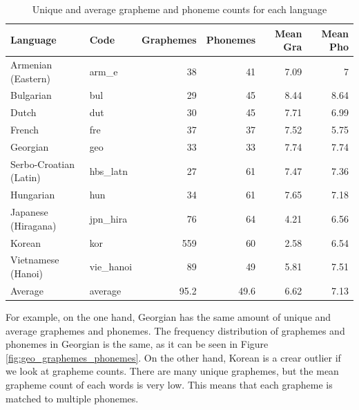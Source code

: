 \documentclass[11pt,a4paper]{article}
\begin{document}
\begin{table}[ht]
\centering
\begin{tabular}{llrrrr}
\toprule
               Language &       Code & Graphemes & Phonemes & Mean Gra & Mean Pho \\
\midrule
     Armenian (Eastern) &      arm\_e &               38 &              41 &              7.09 &                7 \\
              Bulgarian &        bul &               29 &              45 &              8.44 &             8.64 \\
                  Dutch &        dut &               30 &              45 &              7.71 &             6.99 \\
                 French &        fre &               37 &              37 &              7.52 &             5.75 \\
               Georgian &        geo &               33 &              33 &              7.74 &             7.74 \\
 Serbo-Croatian (Latin) &   hbs\_latn &               27 &              61 &              7.47 &             7.36 \\
              Hungarian &        hun &               34 &              61 &              7.65 &             7.18 \\
    Japanese (Hiragana) &   jpn\_hira &               76 &              64 &              4.21 &             6.56 \\
                 Korean &        kor &              559 &              60 &              2.58 &             6.54 \\
     Vietnamese (Hanoi) &  vie\_hanoi &               89 &              49 &              5.81 &             7.51 \\
\midrule
                Average &    average &             95.2 &            49.6 &              6.62 &             7.13 \\
\bottomrule
\end{tabular}
\caption{Unique and average grapheme and phoneme counts for each language}
\label{tab:counts}
\end{table}

For example, on the one hand, Georgian has the same amount of unique and average graphemes and phonemes. The frequency distribution of graphemes and phonemes in Georgian is the same, as it can be seen in Figure \ref{fig:geo_graphemes_phonemes}. On the other hand, Korean is a crear outlier if we look at grapheme counts. There are many unique graphemes, but the mean grapheme count of each words is very low. This means that each grapheme is matched to multiple phonemes.
\end{document}
